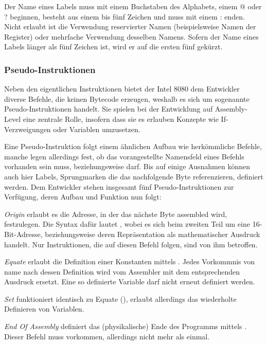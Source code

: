 Der Name eines Labels muss mit einem Buchstaben des Alphabets, einem \glqq @\grqq{} oder \glqq ?\grqq{} beginnen, besteht aus einem bis fünf Zeichen und muss mit einem  \glqq :\grqq{} enden. Nicht erlaubt ist die Verwendung reservierter Namen (beispielsweise Namen der Register) oder mehrfache Verwendung desselben Namens. Sofern der Name eines Labels länger als fünf Zeichen ist, wird er auf die ersten fünf gekürzt.

\subsubsection{Pseudo-Instruktionen}\label{chap:pseudo-instructions}

Neben den eigentlichen Instruktionen bietet der Intel 8080 dem Entwickler diverse Befehle, die keinen Bytecode erzeugen, weshalb es sich um sogenannte \glqq Pseudo-Instruktionen\grqq{} handelt. Sie spielen bei der Entwicklung auf Assembly-Level eine zentrale Rolle, insofern dass sie es erlauben Konzepte wie If-Verzweigungen oder Variablen umzusetzen.

Eine Pseudo-Instruktion folgt einem ähnlichen Aufbau wie herkömmliche Befehle, manche legen allerdings fest, ob das vorangestellte Namensfeld eines Befehls vorhanden sein muss, beziehungsweise darf. Bis auf einige Ausnahmen können auch hier Labels, Sprungmarken die das nachfolgende Byte referenzieren, definiert werden. Dem Entwickler stehen insgesamt fünf Pseudo-Instruktionen zur Verfügung, deren Aufbau und Funktion nun folgt:
\linebreak

\textit{Origin} erlaubt es die Adresse, in der das nächste Byte assembled wird, festzulegen. Die Syntax dafür lautet , wobei es sich beim zweiten Teil um eine 16-Bit-Adresse, beziehungsweise deren Repräsentation als mathematischer Ausdruck handelt. Nur Instruktionen, die auf diesen Befehl folgen, sind von ihm betroffen.

\textit{Equate} erlaubt die Definition einer Konstanten mittels . Jedes Vorkommnis von \glqq name\grqq{} nach dessen Definition wird vom Assembler mit dem entsprechenden Ausdruck ersetzt. Eine so definierte Variable darf nicht erneut definiert werden.

\textit{Set} funktioniert identisch zu Equate (), erlaubt allerdings das wiederholte Definieren von Variablen.

\textit{End Of Assembly} definiert das (physikalische) Ende des Programms mittels . Dieser Befehl muss vorkommen, allerdings nicht mehr als einmal.


